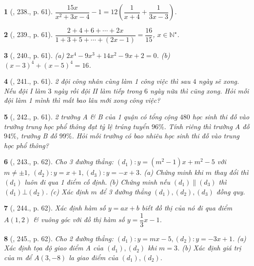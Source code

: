 \documentclass{article}
\newtheorem{baitoan}{}
\begin{document}
\begin{baitoan}[\cite{Tuyen_Toan_8}, 238., p. 61]
	$\dfrac{15x}{x^2 + 3x - 4} - 1 = 12\left(\dfrac{1}{x + 4} + \dfrac{1}{3x - 3}\right)$.
\end{baitoan}

\begin{baitoan}[\cite{Tuyen_Toan_8}, 239., p. 61]
	$\dfrac{2 + 4 + 6 + \cdots + 2x}{1 + 3 + 5 + \cdots + (2x - 1)} = \dfrac{16}{15}$, $x\in\mathbb{N}^\star$.
\end{baitoan}

\begin{baitoan}[\cite{Tuyen_Toan_8}, 240., p. 61]
	(a) $2x^4 - 9x^3 + 14x^2 - 9x + 2 = 0$. (b) $(x - 3)^4 + (x - 5)^4 = 16$.
\end{baitoan}

\begin{baitoan}[\cite{Tuyen_Toan_8}, 241., p. 61]
	2 đội công nhân cùng làm 1 công việc thì sau $4$ ngày sẽ xong. Nếu đội I làm $3$ ngày rồi đội II làm tiếp trong $6$ ngày nữa thì cũng xong. Hỏi mỗi đội làm 1 mình thì mất bao lâu mới xong công việc?
\end{baitoan}

\begin{baitoan}[\cite{Tuyen_Toan_8}, 242., p. 61]
	2 trường A \& B của 1 quận có tổng cộng $480$ học sinh thi đỗ vào trường trung học phổ thông đạt tỷ lệ trúng tuyển $96\%$. Tính riêng thì trường A đỗ $94\%$, trường B đỗ $99\%$. Hỏi mỗi trường có bao nhiêu học sinh thi đỗ vào trung học phổ thông?
\end{baitoan}

\begin{baitoan}[\cite{Tuyen_Toan_8}, 243., p. 62]
	Cho 3 đường thẳng: $(d_1):y = (m^2 - 1)x + m^2 - 5$ với $m\ne\pm1$, $(d_2):y = x + 1,(d_3):y = -x + 3$. (a) Chứng minh khi $m$ thay đổi thì $(d_1)$ luôn đi qua 1 điểm cố định. (b) Chứng minh nếu $(d_1)\parallel(d_3)$ thì $(d_1)\bot(d_2)$. (c) Xác định $m$ để 3 đường thẳng $(d_1),(d_2),(d_3)$ đồng quy.
\end{baitoan}

\begin{baitoan}[\cite{Tuyen_Toan_8}, 244., p. 62]
	Xác định hàm số $y = ax + b$ biết đồ thị của nó đi qua điểm $A(1,2)$ \& vuông góc với đồ thị hàm số $y = \dfrac{1}{3}x - 1$.
\end{baitoan}

\begin{baitoan}[\cite{Tuyen_Toan_8}, 245., p. 62]
	Cho 2 đường thẳng: $(d_1):y = mx - 5,(d_2):y = -3x + 1$. (a) Xác định tọa độ giao điểm A của $(d_1),(d_2)$ khi $m = 3$. (b) Xác định giá trị của $m$ để $A(3,-8)$ la giao điểm của $(d_1),(d_2)$.
\end{baitoan}
\end{document}
